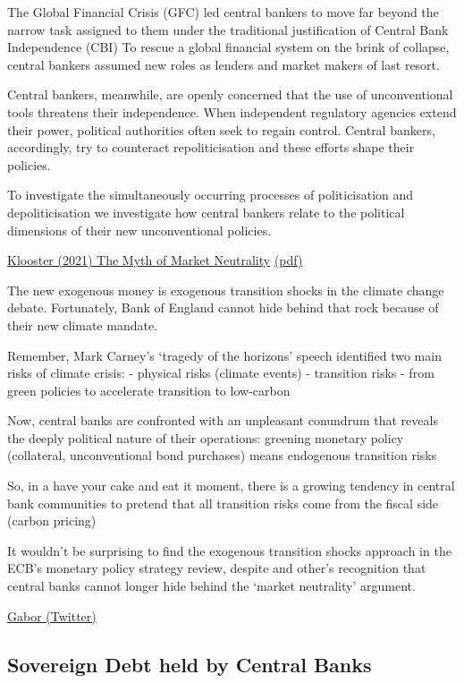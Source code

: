 \documentclass[
]{book}
\begin{document}
The Global Financial Crisis (GFC) led central bankers to move far beyond the narrow task assigned
to them under the traditional justification of Central Bank Independence (CBI)
To rescue a global financial system on the brink of collapse, central bankers assumed new roles as lenders and market makers of last resort.

Central bankers, meanwhile, are openly concerned that the use of unconventional tools threatens
their independence.
When independent regulatory agencies extend their power, political authorities often seek to regain
control.
Central bankers, accordingly, try to counteract repoliticisation and these efforts
shape their policies.

To investigate the simultaneously occurring processes of politicisation and depoliticisation
we investigate how central bankers relate to the political dimensions of their
new unconventional policies.

\href{https://www.tandfonline.com/doi/epub/10.1080/13563467.2019.1657077?needAccess=true}{Klooster (2021) The Myth of Market Neutrality}
\href{pdf/Klooster_2021_Myth_of_Market_Neutrality.pdf}{(pdf)}

The new exogenous money is exogenous transition shocks in the climate change debate.
Fortunately, Bank of England cannot hide behind that rock because of their new climate mandate.

Remember, Mark Carney's `tragedy of the horizons' speech identified two main risks of climate crisis:
- physical risks (climate events)
- transition risks - from green policies to accelerate transition to low-carbon

Now, central banks are confronted with an unpleasant conundrum that reveals the deeply political nature of their operations:
greening monetary policy (collateral, unconventional bond purchases) means endogenous transition risks

So, in a have your cake and eat it moment, there is a growing tendency in central bank communities to pretend that all transition risks come from the fiscal side (carbon pricing)

It wouldn't be surprising to find the exogenous transition shocks approach in the ECB's monetary policy strategy review, despite \citet{Lagarde}
and other's recognition that central banks cannot longer hide behind the `market neutrality' argument.

\href{https://twitter.com/DanielaGabor/status/1384837864412917765}{Gabor (Twitter)}

\hypertarget{sovereign-debt-held-by-central-banks}{%
\subsection{Sovereign Debt held by Central Banks}\label{sovereign-debt-held-by-central-banks}}
\end{document}
